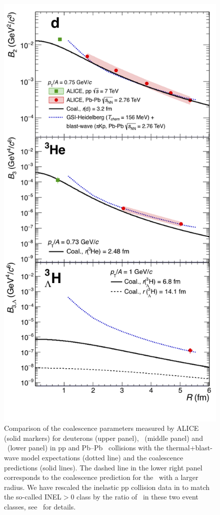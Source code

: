 \documentclass[%
 reprint,
 amsmath,amssymb,
 aps,
]{revtex4-1}
\begin{document}
\begin{figure}[!h]
	\begin{center}
		\includegraphics[width=.95\columnwidth]{compareThermalAndCoalescence.png}
		\caption{Comparison of the coalescence parameters measured by ALICE (solid markers) for deuterons (upper panel), \hethree\ (middle panel) and \hthreelambda\ (lower panel) in pp \cite{ALICE:nucleipp2017} and Pb--Pb~\cite{ALICE:deuteronppPbPb2015, Adam:2015yta} collisions with the  thermal+blast-wave model expectations (dotted line) and the coalescence predictions (solid lines). The dashed line in the lower right panel corresponds to the coalescence prediction for the \hthreelambda\ with a larger radius. We have rescaled the inelastic pp collision data in \cite{ALICE:nucleipp2017} to match the so-called INEL$>$0 class by the ratio of \avdNdeta~in these two event classes, see~\cite{Adam:2015gka} for details. 
		}
		\label{fig:CompareThermalAndCoalescence}
	\end{center}
\end{figure}
\end{document}
